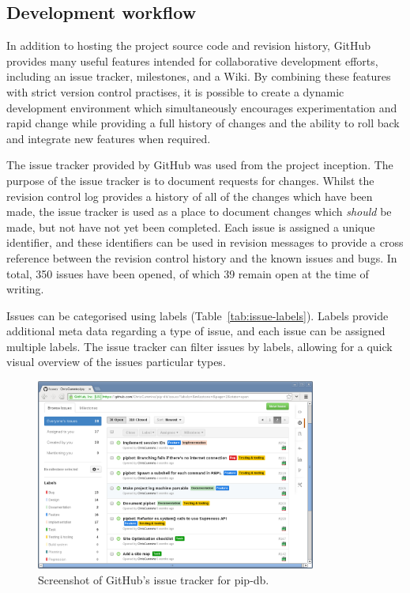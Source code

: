 \subsection{Development workflow}\label{subsec:github-workflow}

In addition to hosting the project source code and revision history,
GitHub provides many useful features intended for collaborative
development efforts, including an issue tracker, milestones, and a
Wiki. By combining these features with strict version control
practises, it is possible to create a dynamic development environment
which simultaneously encourages experimentation and rapid change while
providing a full history of changes and the ability to roll back and
integrate new features when required.

The issue tracker provided by GitHub was used from the project
inception. The purpose of the issue tracker is to document requests
for changes. Whilst the revision control log provides a history of all
of the changes which have been made, the issue tracker is used as a
place to document changes which \textit{should} be made, but not have
not yet been completed. Each issue is assigned a unique identifier,
and these identifiers can be used in revision messages to provide a
cross reference between the revision control history and the known
issues and bugs. In total, 350 issues have been opened, of which 39
remain open at the time of writing.

Issues can be categorised using labels
(Table~\ref{tab:issue-labels}). Labels provide additional meta data
regarding a type of issue, and each issue can be assigned multiple
labels. The issue tracker can filter issues by labels, allowing for a
quick visual overview of the issues particular types.


\begin{figure}[H]
\centering
    \includegraphics[width=0.82\textwidth]{assets/github-issues}
\caption[GitHub project open issues]
        {Screenshot of GitHub's issue tracker for pip-db.}
\label{fig:github-issues}
\end{figure}


